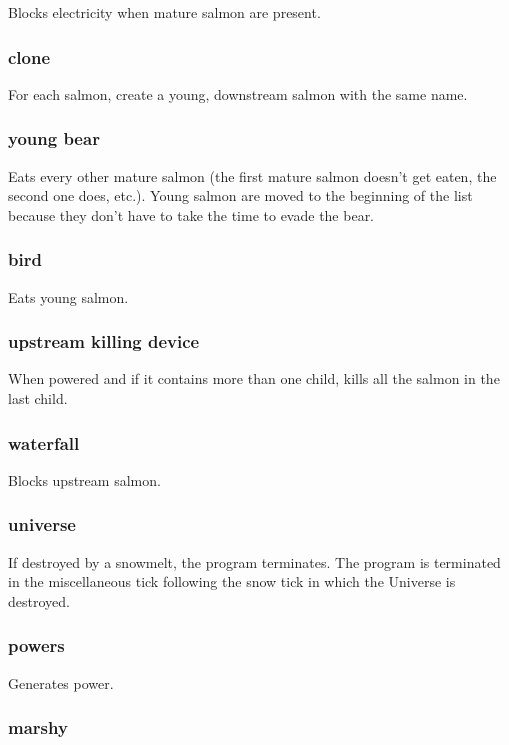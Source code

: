\documentclass[10pt]{article}
\begin{document}
Blocks electricity when mature salmon are present.

\subsubsection{clone}

For each salmon, create a young, downstream salmon with the same name.

\subsubsection{young bear}

Eats every other mature salmon (the first mature salmon doesn't get eaten, the second one does, etc.).
Young salmon are moved to the beginning of the list because they don't have to take the time to evade the bear.

\subsubsection{bird}

Eats young salmon.

\subsubsection{upstream killing device}

When powered and if it contains more than one child,
kills all the salmon in the last child.

\subsubsection{waterfall}

Blocks upstream salmon.

\subsubsection{universe}

If destroyed by a snowmelt, the program terminates. The program is terminated in the miscellaneous tick following the snow tick in which the Universe is
destroyed.

\subsubsection{powers}

Generates power.

\subsubsection{marshy}
\end{document}
